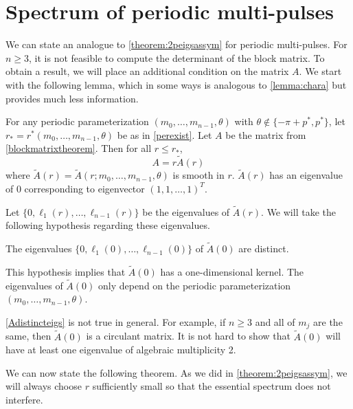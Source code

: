 \documentclass[thesis.tex]{subfiles}
\begin{document}
\section{Spectrum of periodic multi-pulses}

We can state an analogue to \cref{theorem:2peigsassym} for periodic multi-pulses. For $n \geq 3$, it is not feasible to compute the determinant of the block matrix. To obtain a result, we will place an additional condition on the matrix $A$. We start with the following lemma, which in some ways is analogous to \cref{lemma:chara} but provides much less information.

\begin{lemma}\label{lemma:charmatrixA}
For any periodic parameterization $(m_0, \dots, m_{n-1}, \theta)$ with $\theta \notin \{-\pi + p^*, p^* \}$, let $r_* = r^*(m_0, \dots, m_{n-1}, \theta)$ be as in \cref{perexist}. Let $A$ be the matrix from \cref{blockmatrixtheorem}. Then for all $r \leq r_*$,
\[
A = r \tilde{A}(r)
\]
where $\tilde{A}(r) = \tilde{A}(r; m_0, \dots, m_{n-1}, \theta)$ is smooth in $r$. $\tilde{A}(r)$ has an eigenvalue of 0 corresponding to eigenvector $(1, 1, \dots, 1)^T$. 
\end{lemma}

Let $\{ 0, \ell_1(r), \dots, \ell_{n-1}(r) \}$ be the eigenvalues of $\tilde{A}(r)$. We will take the following hypothesis regarding these eigenvalues.

\begin{hypothesis}\label{Adistincteigs}
The eigenvalues $\{ 0, \ell_1(0), \dots, \ell_{n-1}(0)\}$ of $\tilde{A}(0)$ are distinct.
\end{hypothesis}
This hypothesis implies that $\tilde{A}(0)$ has a one-dimensional kernel. The eigenvalues of $\tilde{A}(0)$ only depend on the periodic parameterization $(m_0, \dots, m_{n-1}, \theta)$.

\begin{remark}
\cref{Adistincteigs} is not true in general. For example, if $n \geq 3$ and all of $m_j$ are the same, then $\tilde{A}(0)$ is a circulant matrix. It is not hard to show that $\tilde{A}(0)$ will have at least one eigenvalue of algebraic multiplicity 2.
\end{remark}

We can now state the following theorem. As we did in \cref{theorem:2peigsassym}, we will always choose $r$ sufficiently small so that the essential spectrum does not interfere.
\end{document}
